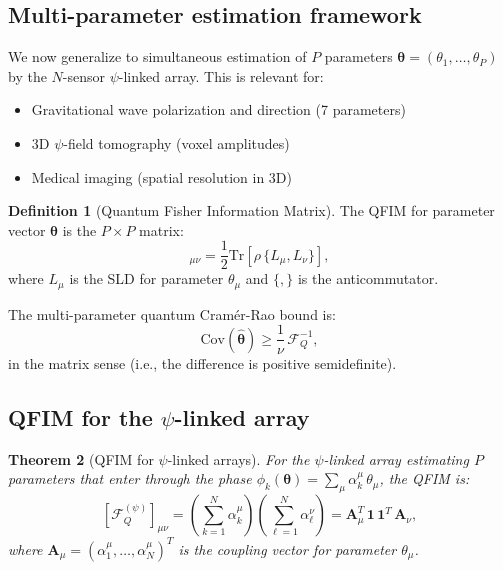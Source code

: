 \documentclass[aps,prl,twocolumn,superscriptaddress,showpacs]{revtex4-2}
\newtheorem{theorem}{Theorem}
\theoremstyle{definition}
\newtheorem{definition}[theorem]{Definition}
\newcommand{\Tr}{\mathrm{Tr}}
\begin{document}
\subsection{Multi-parameter estimation framework}

We now generalize to simultaneous estimation of $P$ parameters
$\boldsymbol{\theta} = (\theta_1, \ldots, \theta_P)$ by the
$N$-sensor $\psi$-linked array. This is relevant for:
\begin{itemize}
\item Gravitational wave polarization and direction (7 parameters)
\item 3D $\psi$-field tomography (voxel amplitudes)
\item Medical imaging (spatial resolution in 3D)
\end{itemize}

\begin{definition}[Quantum Fisher Information Matrix]
The QFIM for parameter vector $\boldsymbol{\theta}$ is the
$P\times P$ matrix:
\begin{equation}
[\mathcal{F}_Q]_{\mu\nu} = \frac{1}{2}\Tr\!\left[\rho\,
\{L_\mu, L_\nu\}\right],
\label{eq:qfim-definition}
\end{equation}
where $L_\mu$ is the SLD for parameter $\theta_\mu$ and $\{,\}$ is
the anticommutator.
\end{definition}

The multi-parameter quantum Cram\'er-Rao bound is:
\begin{equation}
\mathrm{Cov}(\hat{\boldsymbol{\theta}}) \geq \frac{1}{\nu}\,
\mathcal{F}_Q^{-1},
\label{eq:multi-qcrb}
\end{equation}
in the matrix sense (i.e., the difference is positive semidefinite).

\subsection{QFIM for the $\psi$-linked array}

\begin{theorem}[QFIM for $\psi$-linked arrays]\label{thm:qfim}
For the $\psi$-linked array estimating $P$ parameters that enter
through the phase $\phi_k(\boldsymbol{\theta}) = \sum_\mu
\alpha_k^\mu\,\theta_\mu$, the QFIM is:
\begin{equation}
\boxed{[\mathcal{F}_Q^{(\psi)}]_{\mu\nu}
= \left(\sum_{k=1}^N \alpha_k^\mu\right)
\left(\sum_{\ell=1}^N \alpha_\ell^\nu\right)
= \mathbf{A}_\mu^T\,\mathbf{1}\,\mathbf{1}^T\,\mathbf{A}_\nu},
\label{eq:qfim-psi}
\end{equation}
where $\mathbf{A}_\mu = (\alpha_1^\mu, \ldots, \alpha_N^\mu)^T$ is
the coupling vector for parameter $\theta_\mu$.
\end{theorem}
\end{document}
